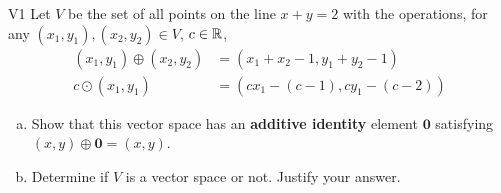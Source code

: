 \documentclass{sbgLAquiz}
\begin{document}
\begin{problem}{V1}
Let $V$ be the set of all points on the line $x+y=2$ with the operations, for any $(x_1,y_1), (x_2,y_2) \in V$, $c \in \mathbb{R}$,
\begin{align*}
(x_1,y_1) \oplus (x_2,y_2) &= (x_1+x_2-1,y_1+y_2-1) \\
c \odot (x_1,y_1) &= (cx_1-(c-1), cy_1-(c-2))
\end{align*}
\begin{enumerate}[(a)]
\item Show that this vector space has an \textbf{additive identity} element
      \(\mathbf{0}\) satisfying \((x,y)\oplus\mathbf{0}=(x,y)\).
\item Determine if $V$ is a vector space or not.  Justify your answer.
\end{enumerate}
\end{problem}
\end{document}
